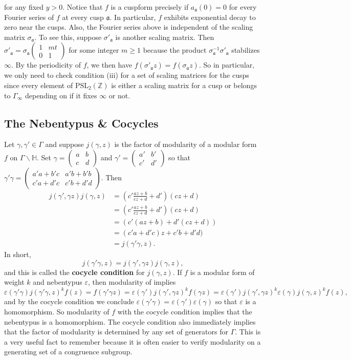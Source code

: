 \documentclass[12pt]{book}
\theoremstyle{definition}\newframedtheorem{method}{Method}
\newcommand{\mf}{\mathfrak}
\newcommand{\PSL}{\mathrm{PSL}}
\newcommand{\Z}{\mathbb{Z}}
\renewcommand{\H}{\mathbb{H}}
\newcommand{\g}{\gamma}
\newcommand{\s}{\sigma}
\newcommand{\G}{\Gamma}
\newcommand{\e}{\varepsilon}
\newcommand{\<}{\langle}
\renewcommand{\>}{\rangle}
\newcommand{\GH}{\G\backslash\H}
\begin{document}
      for any fixed $y > 0$. Notice that $f$ is a cuspform precisely if $a_{\mf{a}}(0) = 0$ for every Fourier series of $f$ at every cusp $\mf{a}$. In particular, $f$ exhibits exponential decay to zero near the cusps. Also, the Fourier series above is independent of the scaling matrix $\s_{\mf{a}}$. To see this, suppose $\s'_{\mf{a}}$ is another scaling matrix. Then $\s'_{\mf{a}} = \s_{\mf{a}}\begin{pmatrix} 1 & mt \\ 0 & 1 \end{pmatrix}$ for some integer $m \ge 1$ because the product $\s_{\mf{a}}^{-1}\s'_{\mf{a}}$ stabilizes $\infty$. By the periodicity of $f$, we then have $f(\s'_{\mf{a}}z) = f(\s_{\mf{a}}z)$. So in particular, we only need to check condition (iii) for a set of scaling matrices for the cusps since every element of $\PSL_{2}(\Z)$ is either a scaling matrix for a cusp or belongs to $\G_{\infty}$ depending on if it fixes $\infty$ or not.
    \subsection*{The Nebentypus \& Cocycles}
      Let $\g,\g' \in \G$ and suppose $j(\g,z)$ is the factor of modularity of a modular form $f$ on $\GH$. Set $\g = \begin{pmatrix} a & b \\ c & d \end{pmatrix}$ and $\g' = \begin{pmatrix} a' & b' \\ c' & d' \end{pmatrix}$ so that $\g'\g = \begin{pmatrix} a'a+b'c & a'b+b'b \\ c'a+d'c & c'b+d'd \end{pmatrix}$. Then
      \begin{align*}
        j(\g',\g z)j(\g,z) &= \left(c'\frac{az+b}{cz+d}+d'\right)(cz+d) \\
        &= \left(c'\frac{az+b}{cz+d}+d'\right)(cz+d) \\
        &= (c'(az+b)+d'(cz+d)) \\
        &= (c'a+d'c)z+c'b+d'd) \\
        &= j(\g'\g,z).
      \end{align*}
      In short,
      \[
        j(\g'\g,z) =  j(\g',\g z)j(\g,z),
      \]
      and this is called the \textbf{cocycle condition} for $j(\g,z)$. If $f$ is a modular form of weight $k$ and nebentypus $\e$, then modularity of implies
      \[
        \e(\g'\g)j(\g'\g,z)^{k}f(z) = f(\g'\g z) = \e(\g')j(\g',\g z)^{k}f(\g z) = \e(\g')j(\g',\g z)^{k}\e(\g)j(\g,z)^{k}f(z),
      \]
      and by the cocycle condition we conclude $\e(\g'\g) = \e(\g')\e(\g)$ so that $\e$ is a homomorphism. So modularity of $f$ with the cocycle condition implies that the nebentypus is a homomorphism. The cocycle condition also immediately implies that the factor of modularity is determined by any set of generators for $\G$. This is a very useful fact to remember because it is often easier to verify modularity on a generating set of a congruence subgroup.
\end{document}
